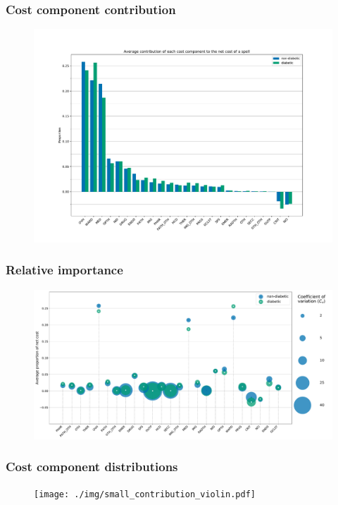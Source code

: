 \documentclass{beamer}
\begin{document}
\begin{frame}
    \frametitle{Cost component contribution}

    \begin{figure}
    \includegraphics[width=\linewidth]{./img/diabetic_cost_contribution.pdf}
    \end{figure}
\end{frame}

\begin{frame}
    \frametitle{Relative importance}

    \begin{figure}
    \includegraphics[width=\linewidth]{./img/diabetic_bubble_contribution.pdf}
    \end{figure}
\end{frame}

\begin{frame}
    \frametitle{Cost component distributions}

    \begin{figure}
    \texttt{[image: ./img/small\_contribution\_violin.pdf]}
    \end{figure}
\end{frame}
\end{document}
